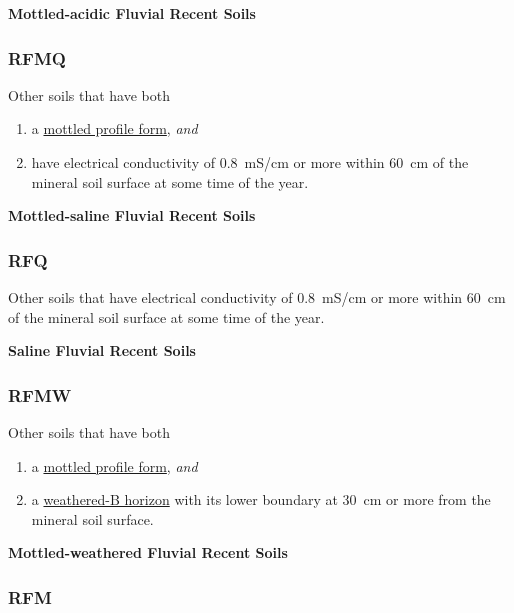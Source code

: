 \documentclass[
  letterpaper,
  DIV=11,
  numbers=noendperiod]{scrreprt}
\providecommand{\tightlist}{%
  \setlength{\itemsep}{0pt}\setlength{\parskip}{0pt}}\usepackage{longtable,booktabs,array}
\begin{document}
\textbf{Mottled-acidic Fluvial Recent Soils}

\hypertarget{sec-key-RFMQ}{%
\subsubsection{\texorpdfstring{\textbf{RFMQ}}{RFMQ}}\label{sec-key-RFMQ}}

Other soils that have both

\begin{enumerate}
\def\labelenumi{\arabic{enumi}.}
\tightlist
\item
  a \protect\hyperlink{sec-diag-mottpf}{mottled profile form},
  \emph{and}
\item
  have electrical conductivity of 0.8~mS/cm or more within 60~cm of the
  mineral soil surface at some time of the year.
\end{enumerate}

\textbf{Mottled-saline Fluvial Recent Soils}

\hypertarget{sec-key-RFQ}{%
\subsubsection{\texorpdfstring{\textbf{RFQ}}{RFQ}}\label{sec-key-RFQ}}

Other soils that have electrical conductivity of 0.8~mS/cm or more
within 60~cm of the mineral soil surface at some time of the year.

\textbf{Saline Fluvial Recent Soils}

\hypertarget{sec-key-RFMW}{%
\subsubsection{\texorpdfstring{\textbf{RFMW}}{RFMW}}\label{sec-key-RFMW}}

Other soils that have both

\begin{enumerate}
\def\labelenumi{\arabic{enumi}.}
\tightlist
\item
  a \protect\hyperlink{sec-diag-mottpf}{mottled profile form},
  \emph{and}
\item
  a \protect\hyperlink{sec-diag-bw}{weathered-B horizon} with its lower
  boundary at 30~cm or more from the mineral soil surface.
\end{enumerate}

\textbf{Mottled-weathered Fluvial Recent Soils}

\hypertarget{sec-key-RFM}{%
\subsubsection{\texorpdfstring{\textbf{RFM}}{RFM}}\label{sec-key-RFM}}
\end{document}
